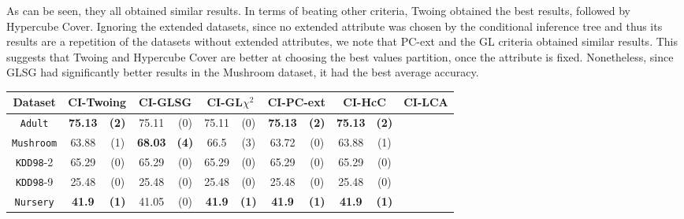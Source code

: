 As can be seen, they all obtained similar results. In terms of beating other criteria, Twoing obtained the best results, followed by Hypercube Cover. Ignoring the extended datasets, since no extended attribute was chosen by the conditional inference tree and thus its results are a repetition of the datasets without extended attributes, we note that PC-ext and the GL criteria obtained similar results. This suggests that Twoing and Hypercube Cover are better at choosing the best values partition, once the attribute is fixed. Nonetheless, since GLSG had significantly better results in the Mushroom dataset, it had the best average accuracy.


\begin{table*}
\small
\centering
\begin{tabular}{c|cc|cc|cc|cc|cc|cc} 
Dataset  &   \multicolumn{2}{c|}{CI-Twoing} &   \multicolumn{2}{c|}{CI-GLSG} & \multicolumn{2}{c|}{CI-GL$\chi^2$}& \multicolumn{2}{c|}{CI-PC-ext}& \multicolumn{2}{c|}{CI-HcC}& \multicolumn{2}{c}{CI-LCA} \\  \hline   
{\tt Adult}        &{\bf 75.13} & {\bf (2)} & 75.11       & (0)       & 75.11       & (0)       & {\bf 75.13} & {\bf (2)} & {\bf 75.13} & {\bf (2)} &             &           \\
{\tt Mushroom}     &63.88       & (1)       &{\bf 68.03 } & {\bf (4)} & 66.5        & (3)       & 63.72       & (0)       & 63.88       & (1)       &             &           \\
{\tt KDD98}-2      &65.29       & (0)       & 65.29       & (0)       & 65.29       & (0)       & 65.29       & (0)       & 65.29       & (0)       &             &           \\
{\tt KDD98}-9      &25.48       & (0)       & 25.48       & (0)       & 25.48       & (0)       & 25.48       & (0)       & 25.48       & (0)       &             &           \\
{\tt Nursery}      &{\bf 41.9}  & {\bf (1)} & 41.05       & (0)       & {\bf 41.9}  & {\bf (1)} & {\bf 41.9}  & {\bf (1)} & {\bf 41.9}  & {\bf (1)} &             &           \\

\end{tabular}
\end{table*}
